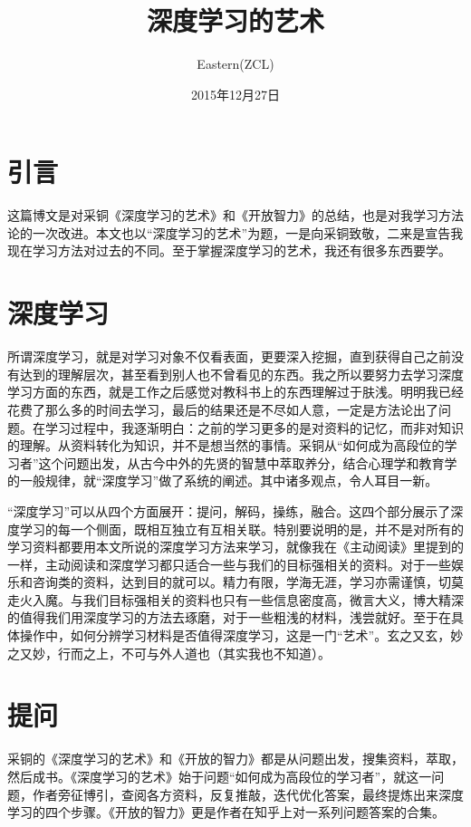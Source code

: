 \documentclass[10pt,a4paper,UTF8]{article}
\author{Eastern(ZCL)}
\date{2015年12月27日}
\title{深度学习的艺术}
\begin{document}
\maketitle
\tableofcontents


\section{引言}
\label{sec:orgheadline1}


这篇博文是对采铜《深度学习的艺术》和《开放智力》的总结，也是对我学习方法论的一次改进。本文也以“深度学习的艺术”为题，一是向采铜致敬，二来是宣告我现在学习方法对过去的不同。至于掌握深度学习的艺术，我还有很多东西要学。

\section{深度学习}
\label{sec:orgheadline2}


所谓深度学习，就是对学习对象不仅看表面，更要深入挖掘，直到获得自己之前没有达到的理解层次，甚至看到别人也不曾看见的东西。我之所以要努力去学习深度学习方面的东西，就是工作之后感觉对教科书上的东西理解过于肤浅。明明我已经花费了那么多的时间去学习，最后的结果还是不尽如人意，一定是方法论出了问题。在学习过程中，我逐渐明白：之前的学习更多的是对资料的记忆，而非对知识的理解。从资料转化为知识，并不是想当然的事情。采铜从“如何成为高段位的学习者”这个问题出发，从古今中外的先贤的智慧中萃取养分，结合心理学和教育学的一般规律，就“深度学习”做了系统的阐述。其中诸多观点，令人耳目一新。

“深度学习”可以从四个方面展开：提问，解码，操练，融合。这四个部分展示了深度学习的每一个侧面，既相互独立有互相关联。特别要说明的是，并不是对所有的学习资料都要用本文所说的深度学习方法来学习，就像我在《主动阅读》里提到的一样，主动阅读和深度学习都只适合一些与我们的目标强相关的资料。对于一些娱乐和咨询类的资料，达到目的就可以。精力有限，学海无涯，学习亦需谨慎，切莫走火入魔。与我们目标强相关的资料也只有一些信息密度高，微言大义，博大精深的值得我们用深度学习的方法去琢磨，对于一些粗浅的材料，浅尝就好。至于在具体操作中，如何分辨学习材料是否值得深度学习，这是一门“艺术”。玄之又玄，妙之又妙，行而之上，不可与外人道也（其实我也不知道）。

\section{提问}
\label{sec:orgheadline3}


采铜的《深度学习的艺术》和《开放的智力》都是从问题出发，搜集资料，萃取，然后成书。《深度学习的艺术》始于问题“如何成为高段位的学习者”，就这一问题，作者旁征博引，查阅各方资料，反复推敲，迭代优化答案，最终提炼出来深度学习的四个步骤。《开放的智力》更是作者在知乎上对一系列问题答案的合集。
\end{document}
